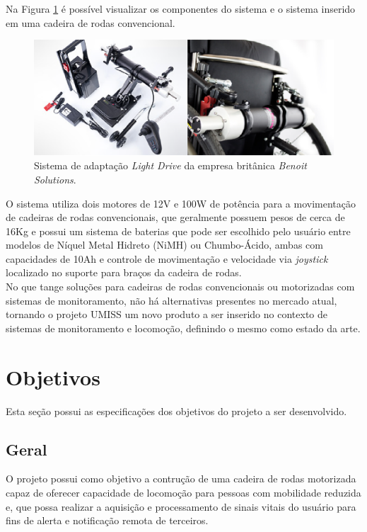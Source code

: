 Na Figura \ref{ldrive} é possível visualizar os componentes do sistema e
o sistema inserido em uma cadeira de rodas convencional.

\begin{figure}[h]
    \centering
    \label{ldrive}
    \includegraphics[keepaspectratio=true,scale=0.7]{figuras/ldrive.eps}
    \caption{Sistema de adaptação \textit{Light Drive} da empresa britânica \textit{Benoit Solutions}.}
\end{figure}

O sistema utiliza dois motores de 12V e 100W de potência para a movimentação 
de cadeiras de rodas convencionais, que geralmente possuem pesos de cerca de 16Kg 
e possui um sistema de baterias que pode ser escolhido pelo usuário entre modelos 
de Níquel Metal Hidreto  (NiMH) ou Chumbo-Ácido, ambas com capacidades de 10Ah 
e controle de movimentação e velocidade via \textit{joystick} localizado no 
suporte para braços da cadeira de rodas.\\

No que tange soluções para cadeiras de rodas convencionais ou motorizadas
com sistemas de monitoramento, não há alternativas presentes no mercado
atual, tornando o projeto UMISS um novo produto a ser inserido no contexto
de sistemas de monitoramento e locomoção, definindo o mesmo como estado da arte.

\section{Objetivos}
Esta seção possui as especificações dos objetivos do projeto a ser desenvolvido.

\subsection{Geral}
O projeto possui como objetivo a contrução de uma cadeira de rodas motorizada capaz de
oferecer capacidade de locomoção para pessoas com mobilidade reduzida
e, que possa realizar
a aquisição e processamento de sinais vitais do usuário para fins de alerta e notificação
remota de terceiros.

